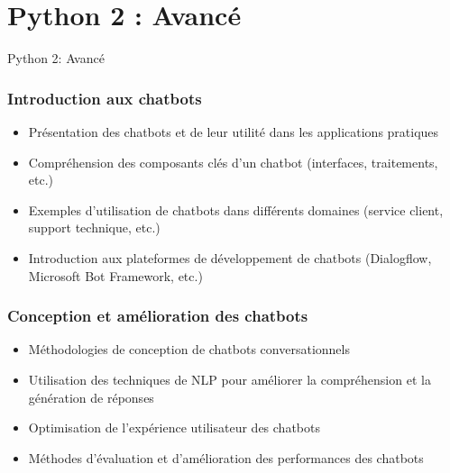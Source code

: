 \documentclass{beamer}
\begin{document}
\section{Python 2 : Avancé}
{
\begin{frame}{Python 2: Avancé}
\end{frame}
}



\begin{frame}
	\frametitle{Introduction aux chatbots}
	\begin{itemize}
		\item Présentation des chatbots et de leur utilité dans les applications pratiques
		\item Compréhension des composants clés d'un chatbot (interfaces, traitements, etc.)
		\item Exemples d'utilisation de chatbots dans différents domaines (service client, support technique, etc.)
		\item Introduction aux plateformes de développement de chatbots (Dialogflow, Microsoft Bot Framework, etc.)
	\end{itemize}
\end{frame}

\begin{frame}
	\frametitle{Conception et amélioration des chatbots}
	\begin{itemize}
		\item Méthodologies de conception de chatbots conversationnels
		\item Utilisation des techniques de NLP pour améliorer la compréhension et la génération de réponses
		\item Optimisation de l'expérience utilisateur des chatbots
		\item Méthodes d'évaluation et d'amélioration des performances des chatbots
	\end{itemize}
\end{frame}
\end{document}
